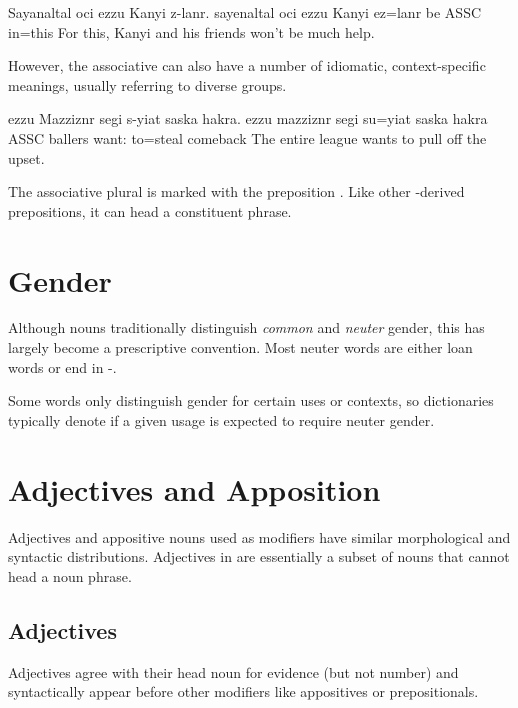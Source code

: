 \begin{example} \label{ex:ezzu_basic}
    \script Sayanaltal oci ezzu Kanyi z-lanr.
    \bits sayenaltal oci ezzu Kanyi ez=lanr
     be ASSC  in=this
    \tr For this, Kanyi and his friends won't be much help.
\end{example}

However, the associative can also have a number of idiomatic, context-specific meanings, usually referring to diverse groups.

\begin{example} \label{ex:ezzu_idiom}
    \script ezzu Mazziznr segi s-yiat saska hakra.
    \bits ezzu mazziznr segi su=yiat {saska hakra}
    \gloss ASSC ballers want: to=steal comeback
    \tr The entire league wants to pull off the upset.
\end{example}

The associative plural is marked with the preposition . Like other -derived prepositions, it can head a constituent phrase.

\section{Gender}
Although nouns traditionally distinguish \emph{common} and \emph{neuter} gender, this has largely become a prescriptive convention.  Most neuter words are either loan words or end in -.

Some words only distinguish gender for certain uses or contexts, so dictionaries typically denote if a given usage is expected to require neuter gender.

\section{Adjectives and Apposition}
Adjectives and appositive nouns used as modifiers have similar morphological and syntactic distributions. Adjectives in \langname{} are essentially a subset of nouns that cannot head a noun phrase.

\subsection{Adjectives}
Adjectives agree with their head noun for evidence (but not number) and syntactically appear before other modifiers like appositives or prepositionals.


